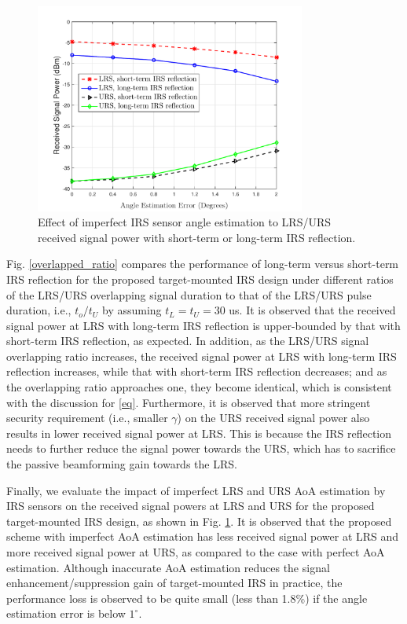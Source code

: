 \documentclass[10pt,final,doublecolumn]{IEEEtran}
\begin{document}
\begin{figure}[t]
\centering
\setlength{\abovecaptionskip}{0.cm}
\includegraphics[width=3.5in]{error.pdf}
\caption{Effect of imperfect IRS sensor angle estimation to LRS/URS received signal power with short-term or long-term IRS reflection.}
\label{error}
\end{figure}

Fig. \ref{overlapped_ratio} compares the performance of long-term versus short-term IRS reflection for the proposed target-mounted IRS design under different ratios of the LRS/URS overlapping signal duration to that of the LRS/URS pulse duration, i.e., $t_o/t_U$ by assuming $t_L=t_U=30$ us. It is observed that the received signal power at LRS with long-term IRS reflection is upper-bounded by that with short-term IRS reflection, as expected. In addition, as the LRS/URS signal overlapping ratio increases, the received signal power at LRS with long-term IRS reflection increases, while that with short-term IRS reflection decreases; and as the overlapping ratio approaches one, they become identical, which is consistent with the discussion for  \eqref{eq}. Furthermore, it is observed that more stringent security requirement (i.e., smaller $\gamma$) on the URS received signal power also results in lower received signal power at LRS. This is because the IRS reflection needs to further reduce the signal power towards the URS, which has to sacrifice the passive beamforming gain towards the LRS.

Finally, we evaluate the impact of imperfect LRS and URS
AoA estimation by IRS sensors on the received signal powers at LRS and URS
for the proposed target-mounted IRS design, as shown in Fig. \ref{error}. It is observed that the proposed scheme with
imperfect AoA estimation has less received signal power at
LRS and more received signal power at URS, as compared to
the case with perfect AoA estimation. Although inaccurate
AoA estimation reduces the signal enhancement/suppression
gain of target-mounted IRS in practice, the performance loss
is observed to be quite small (less than 1.8\%) if the angle estimation error is below $1^{\circ}$.
\end{document}
